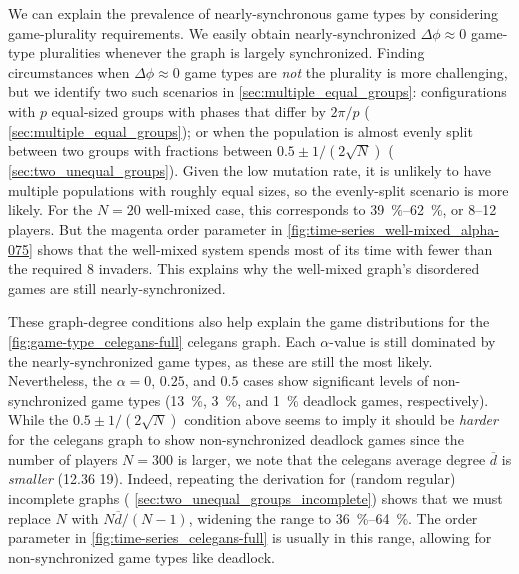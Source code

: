\documentclass[pdflatex,lineno,referee,sn-nature]{sn-jnl}
\begin{document}
We can explain the prevalence of nearly-synchronous game types
by considering game-plurality requirements.
We easily obtain nearly-synchronized $\Delta \phi \approx 0$
game-type pluralities whenever the graph is largely synchronized.
Finding circumstances when $\Delta \phi \approx 0$ game types
are \emph{not} the plurality is more challenging,
but we identify two such scenarios in \cref{sec:multiple_equal_groups}:
configurations with $p$ equal-sized groups
with phases that differ by $2 \pi/p$ (\cf{} \cref{sec:multiple_equal_groups});
or when the population is almost evenly split between two groups
with fractions between $0.5 \pm 1/(2 \sqrt{N})$
(\cf{} \cref{sec:two_unequal_groups}).
Given the low mutation rate, it is unlikely to have
multiple populations with roughly equal sizes,
so the evenly-split scenario is more likely.
For the $N = 20$ well-mixed case, this corresponds
to \SIrange{39}{62}{\percent}, or \numrange{8}{12} players.
But the magenta order parameter in \cref{fig:time-series_well-mixed_alpha-075}
shows that the well-mixed system spends most of its time
with fewer than the required \num{8} invaders.
This explains why the well-mixed graph's disordered games
are still nearly-synchronized.

These graph-degree conditions also help explain the
game distributions for the
\cref{fig:game-type_celegans-full} \gls{celegans} graph.
Each $\alpha$-value is still dominated by the nearly-synchronized
game types, as these are still the most likely.
Nevertheless, the $\alpha = 0$, $0.25$, and $0.5$ cases
show significant levels of non-synchronized game types
(\SI{13}{\percent}, \SI{3}{\percent}, and \SI{1}{\percent} deadlock games,
respectively).
While the $0.5 \pm 1/(2 \sqrt{N})$ condition above seems to imply it
should be \emph{harder} for the \gls{celegans} graph to show
non-synchronized deadlock games since
the number of players $N=300$ is larger,
we note that the \gls{celegans} average degree $\overline{d}$
is \emph{smaller} (\num{12.36} \vs{} \num{19}).
Indeed, repeating the derivation for (random regular) incomplete graphs
(\cf{} \cref{sec:two_unequal_groups_incomplete})
shows that we must replace $N$ with $N \overline{d}/(N-1)$,
widening the range to \SIrange{36}{64}{\percent}.
The order parameter in \cref{fig:time-series_celegans-full}
is usually in this range,
allowing for non-synchronized game types like deadlock.
\end{document}
